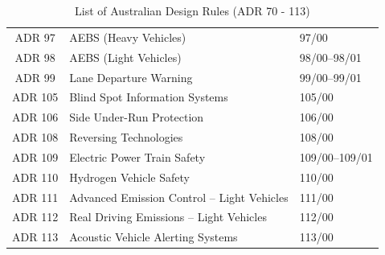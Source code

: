 \begin{table}[h]
\begin{tabularx}{\textwidth}{|c|X|X|}
            ADR 97 & AEBS (Heavy Vehicles) & 97/00 \\
            ADR 98 & AEBS (Light Vehicles) & 98/00–98/01 \\
            ADR 99 & Lane Departure Warning & 99/00–99/01 \\
            ADR 105 & Blind Spot Information Systems & 105/00 \\
            ADR 106 & Side Under-Run Protection & 106/00 \\
            ADR 108 & Reversing Technologies & 108/00 \\
            ADR 109 & Electric Power Train Safety & 109/00–109/01 \\
            ADR 110 & Hydrogen Vehicle Safety & 110/00 \\
            ADR 111 & Advanced Emission Control – Light Vehicles & 111/00 \\
            
            ADR 112 & Real Driving Emissions – Light Vehicles & 112/00 \\
            ADR 113 & Acoustic Vehicle Alerting Systems & 113/00 \\
            
            \hline
            \end{tabularx}
            \caption{List of Australian Design Rules (ADR 70 - 113)}
            \label{tab:adr3}
        \end{table}
    